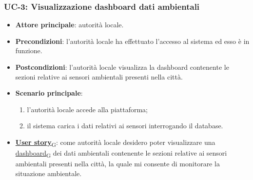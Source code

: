 \subsubsection{UC-3: Visualizzazione dashboard dati ambientali}
\begin{itemize}
	\item \textbf{Attore principale}: autorità locale.
	\item \textbf{Precondizioni}: l'autorità locale ha effettuato l'accesso al sistema ed esso è in funzione.
	\item \textbf{Postcondizioni}: l'autorità locale visualizza la dashboard contenente le sezioni relative ai sensori ambientali presenti nella città.
	\item \textbf{Scenario principale}:
	      \begin{enumerate}
		      \item l'autorità locale accede alla piattaforma;
		      \item il sistema carica i dati relativi ai sensori interrogando il database.
	      \end{enumerate}
	\item \href{https://7last.github.io/docs/rtb/documentazione-interna/glossario\#user-story}{\textbf{User story}\textsubscript{G}}: come autorità locale desidero poter visualizzare una \href{https://7last.github.io/docs/rtb/documentazione-interna/glossario\#dashboard}{dashboard\textsubscript{G}} dei dati ambientali contenente le sezioni relative ai sensori ambientali presenti nella città, la quale mi consente di monitorare la situazione ambientale.
\end{itemize}
\begin{center}
\end{center}


